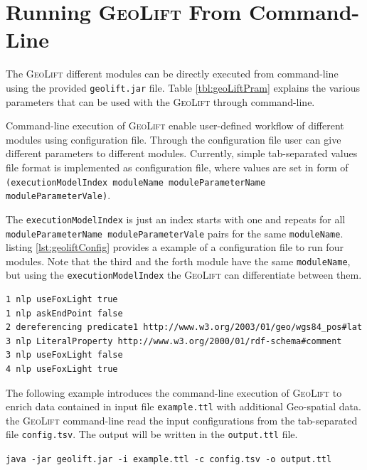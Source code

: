 \documentclass[a4paper,twoside,bibtotoc,abstracton,12pt,BCOR=15mm]{article}
\newcommand{\geolift}{\textsc{GeoLift}\xspace}
\begin{document}

\section{Running \geolift From Command-Line }

The \geolift different modules can be directly executed from command-line using the provided \texttt{geolift.jar} file.
Table \ref{tbl:geoLiftPram} explains the various parameters that can be used with the \geolift through command-line. 

Command-line execution of \geolift enable user-defined workflow of different modules using configuration file.
Through the configuration file user can give different parameters to different modules.
Currently, simple tab-separated values file format is implemented as configuration file, 
where values are set in form of \texttt{(executionModelIndex moduleName moduleParameterName moduleParameterVale)}.

The \texttt{executionModelIndex} is just an index starts with one and repeats for all \texttt{moduleParameterName moduleParameterVale} pairs for the same \texttt{moduleName}.
listing \ref{lst:geoliftConfig} provides a example of a configuration file to run four modules.
Note that the third and the forth module have the same \texttt{moduleName}, but using the \texttt{executionModelIndex} the \geolift can differentiate between them.

\newpage

\begin{lstlisting}[label=lst:geoliftConfig, caption =\geolift configuration file example class.]
1 nlp useFoxLight true
1 nlp askEndPoint false
2 dereferencing predicate1 http://www.w3.org/2003/01/geo/wgs84_pos#lat
3 nlp LiteralProperty http://www.w3.org/2000/01/rdf-schema#comment
3 nlp useFoxLight false
4 nlp useFoxLight true
\end{lstlisting}

The following example introduces the command-line execution of \geolift to enrich data contained in input file \texttt{example.ttl} with additional Geo-spatial data.
the \geolift command-line read the input configurations from the tab-separated file \texttt{config.tsv}.
The output will be written in the \texttt{output.ttl} file.

{\flushleft\texttt{java -jar geolift.jar -i example.ttl -c config.tsv -o output.ttl}}
\end{document}
